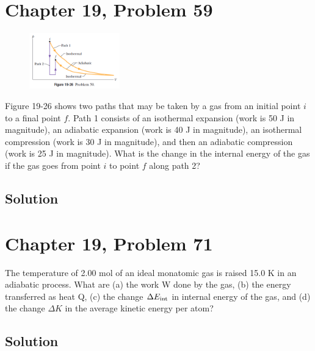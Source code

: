 \documentclass{article}
\begin{document}
    \section{Chapter 19, Problem 59}
        \begin{figure}
            \vspace{-30pt}
            \includegraphics[width=0.35\textwidth]{picture_19-26.png} 
        \end{figure}
        Figure 19-26 shows two paths that may be taken by a gas from an initial point $i$ to a final point $f$. 
        Path 1 consists of an isothermal expansion (work is 50 J in magnitude), an adiabatic expansion (work is 40 J in magnitude), an isothermal compression (work is 30 J in magnitude), and then an adiabatic compression (work is 25 J in magnitude). 
        What is the change in the internal energy of the gas if the gas goes from point $i$ to point $f$ along path 2?

        \subsection{Solution}
    
    \pagebreak
    \section{Chapter 19, Problem 71}
        The temperature of 2.00 mol of an ideal monatomic gas is raised 15.0 K in an adiabatic process. 
        What are (a) the work W done by the gas, (b) the energy transferred as heat Q, (c) the change $\Delta E_{\rm int}$ in internal energy of the gas, and (d) the change $\Delta K$ in the average kinetic energy per atom?

        \subsection{Solution}
\end{document}
